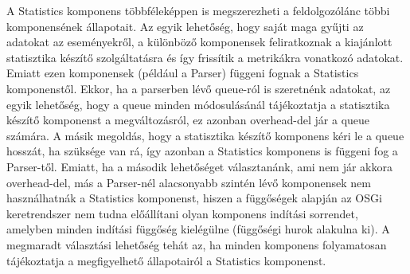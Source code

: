 A Statistics komponens többféleképpen is megszerezheti a feldolgozólánc többi komponensének állapotait. Az egyik lehetőség, hogy saját maga gyűjti az adatokat az eseményekről, a különböző komponensek feliratkoznak a kiajánlott statisztika készítő szolgáltatásra és így frissítik a metrikákra vonatkozó adatokat. Emiatt ezen komponensek (például a Parser) függeni fognak a Statistics komponenstől. Ekkor, ha a parserben lévő queue-ról is szeretnénk adatokat, az egyik lehetőség, hogy a queue minden módosulásánál tájékoztatja a statisztika készítő komponenst a megváltozásról, ez azonban overhead-del jár a queue számára. A másik megoldás, hogy a statisztika készítő komponens kéri le a queue hosszát, ha szüksége van rá, így azonban a Statistics komponens is függeni fog a Parser-től. Emiatt, ha a második lehetőséget választanánk, ami nem jár akkora overhead-del, más a Parser-nél alacsonyabb szintén lévő komponensek nem használhatnák a Statistics komponenst, hiszen a függőségek alapján az OSGi keretrendszer nem tudna előállítani olyan komponens indítási sorrendet, amelyben minden indítási függőség kielégülne (függőségi hurok alakulna ki). A megmaradt választási lehetőség tehát az, ha minden komponens folyamatosan tájékoztatja a megfigyelhető állapotairól a Statistics komponenst.


